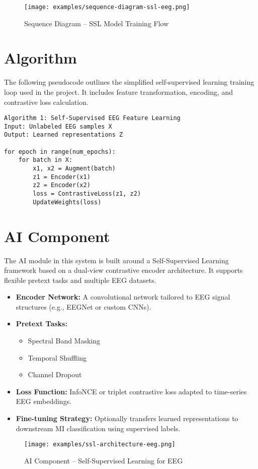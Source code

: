 \begin{figure}[H]
    \centering
    \texttt{[image: examples/sequence-diagram-ssl-eeg.png]}
    \caption{Sequence Diagram – SSL Model Training Flow}
\end{figure}

\section{Algorithm}
\label{section:algorithm}

The following pseudocode outlines the simplified self-supervised learning training loop used in the project. It includes feature transformation, encoding, and contrastive loss calculation.

\begin{verbatim}
Algorithm 1: Self-Supervised EEG Feature Learning
Input: Unlabeled EEG samples X
Output: Learned representations Z

for epoch in range(num_epochs):
    for batch in X:
        x1, x2 = Augment(batch)
        z1 = Encoder(x1)
        z2 = Encoder(x2)
        loss = ContrastiveLoss(z1, z2)
        UpdateWeights(loss)
\end{verbatim}

\section{AI Component}
\label{section:ai-Component}

The AI module in this system is built around a Self-Supervised Learning framework based on a dual-view contrastive encoder architecture. It supports flexible pretext tasks and multiple EEG datasets.

\begin{itemize}
    \item \textbf{Encoder Network:} A convolutional network tailored to EEG signal structures (e.g., EEGNet or custom CNNs).
    \item \textbf{Pretext Tasks:}
    \begin{itemize}
        \item Spectral Band Masking
        \item Temporal Shuffling
        \item Channel Dropout
    \end{itemize}
    \item \textbf{Loss Function:} InfoNCE or triplet contrastive loss adapted to time-series EEG embeddings.
    \item \textbf{Fine-tuning Strategy:} Optionally transfers learned representations to downstream MI classification using supervised labels.
\end{itemize}

\begin{figure}[H]
    \centering
    \texttt{[image: examples/ssl-architecture-eeg.png]}
    \caption{AI Component – Self-Supervised Learning for EEG}
\end{figure}
